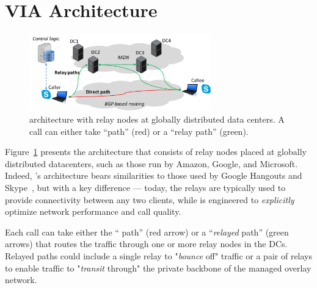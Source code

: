 \section{VIA Architecture}
\label{sec:via:arch}

\begin{figure}[t!]
\centering
\includegraphics[width=0.7\textwidth]{figures/Via-MdnOverview.pdf}
\caption{\hybrid architecture with relay nodes at globally distributed data centers. A call can either take ``\direct path'' (red) or a ``relay path'' (green).}
\label{fig:mdn-overview}
\end{figure}

Figure~\ref{fig:mdn-overview} presents the \hybrid architecture that consists of relay nodes placed at globally distributed datacenters, such as those run by Amazon, Google, and Microsoft. 
Indeed, {\hybrid}'s architecture bears similarities to those used by Google Hangouts and Skype~\cite{VideoTelephony-IMC12}, but with a key difference --- today, the relays are typically used to provide connectivity between any two clients, while \hybrid is engineered to {\em explicitly} optimize network performance and call quality.

Each call can take either the ``{\em \direct} path'' (red arrow) or a ``{\em relayed} path'' (green arrows) that routes the traffic through one or more relay nodes in the DCs. Relayed paths could include a single relay to "{\em bounce} off" traffic or a pair of relays to enable traffic to "{\em transit} through" the private backbone of the managed overlay network. 


